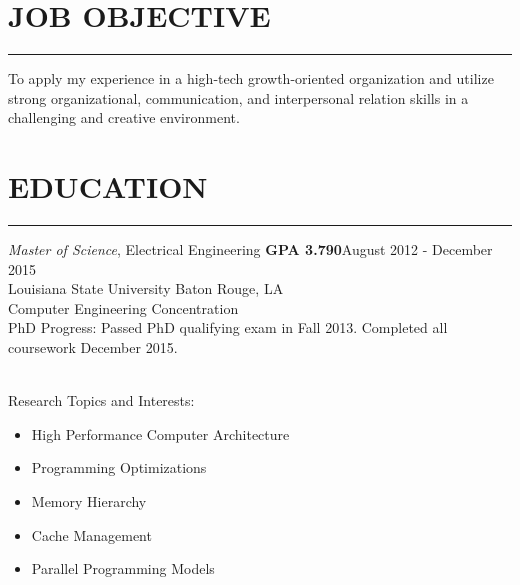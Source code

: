 \documentclass{res}
\begin{document}
 


\address{\bf  PRESENT ADDRESS\\Southlake Avenue\\Baton Rouge, LA 70804}  
\address{\bf PERMANENT ADDRESS \\Smith Drive\\  Walker , LA 70785}
                                  
\begin{resume}

\section{JOB OBJECTIVE}
	\rule{\textwidth}{0.5pt}
    To apply my experience in a high-tech growth-oriented organization and utilize strong organizational, communication, and interpersonal relation skills in a challenging and creative environment.      
    
\section{EDUCATION}
	\rule{\textwidth}{0.5pt}
	\vspace{-0.3in} 
	
	{\sl Master of Science}, Electrical Engineering {\bf GPA 3.790}\hfill August 2012 - December 2015\\ 
	Louisiana State University \hfill Baton Rouge, LA\\   
	{\footnotesize Computer Engineering Concentration\\
	PhD Progress: Passed PhD qualifying exam in Fall 2013. Completed all coursework  December 2015.}\\\\
	\vspace{-0.49in}
	\begin{multicols}{2}
	{\footnotesize 
		Research Topics and Interests: \vspace{-0.175in}
		\begin{itemize}
			\item High Performance Computer Architecture
			\item Programming Optimizations
			\item Memory Hierarchy
			\item Cache Management
			\item Parallel Programming Models 
			\end{itemize}
		
}
\end{multicols}
\end{resume}
\end{document}
